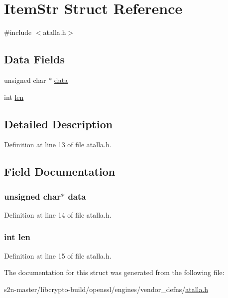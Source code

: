 \hypertarget{struct_item_str}{}\section{Item\+Str Struct Reference}
\label{struct_item_str}


{\ttfamily \#include $<$atalla.\+h$>$}

\subsection*{Data Fields}
\begin{DoxyCompactItemize}
\item 
unsigned char $\ast$ \hyperlink{struct_item_str_ac24cea2bfcc927fd29bc74d1086707d8}{data}
\item 
int \hyperlink{struct_item_str_afed088663f8704004425cdae2120b9b3}{len}
\end{DoxyCompactItemize}


\subsection{Detailed Description}


Definition at line 13 of file atalla.\+h.



\subsection{Field Documentation}
\subsubsection[{\texorpdfstring{data}{data}}]{\setlength{\rightskip}{0pt plus 5cm}unsigned char$\ast$ data}\hypertarget{struct_item_str_ac24cea2bfcc927fd29bc74d1086707d8}{}\label{struct_item_str_ac24cea2bfcc927fd29bc74d1086707d8}


Definition at line 14 of file atalla.\+h.

\subsubsection[{\texorpdfstring{len}{len}}]{\setlength{\rightskip}{0pt plus 5cm}int len}\hypertarget{struct_item_str_afed088663f8704004425cdae2120b9b3}{}\label{struct_item_str_afed088663f8704004425cdae2120b9b3}


Definition at line 15 of file atalla.\+h.



The documentation for this struct was generated from the following file\+:\begin{DoxyCompactItemize}
\item 
s2n-\/master/libcrypto-\/build/openssl/engines/vendor\+\_\+defns/\hyperlink{atalla_8h}{atalla.\+h}\end{DoxyCompactItemize}
